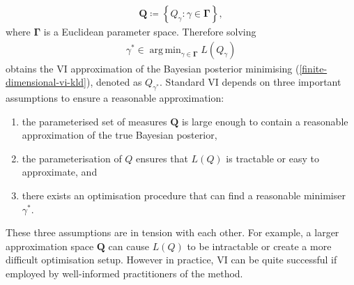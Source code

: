 \documentclass{article}
\DeclareMathOperator*{\argmin}{arg\,min}
\numberwithin{equation}{section}
\begin{document}
\begin{align}
    \boldsymbol{Q} \coloneqq \left\{Q_{\gamma}: \gamma \in \boldsymbol{\Gamma} \right\},
\end{align}
where $\boldsymbol{\Gamma}$ is a Euclidean parameter space. Therefore solving
\begin{align}
    \gamma^* \in \argmin_{\gamma \in \boldsymbol{\Gamma}} L(Q_{\gamma})
\end{align}
obtains the VI approximation of the Bayesian posterior minimising (\ref{finite-dimensional-vi-kld}), denoted as $Q_{\gamma^*}$. 
Standard VI depends on three important assumptions to ensure a reasonable approximation:
\begin{enumerate}
    \setlength\itemsep{-0.25em}
    \item the parameterised set of measures $\boldsymbol{Q}$ is large enough to contain a reasonable approximation of the true Bayesian posterior,
    \item the parameterisation of $Q$ ensures that $L(Q)$ is tractable or easy to approximate, and
    \item there exists an optimisation procedure that can find a reasonable minimiser $\gamma^*$.
\end{enumerate}
These three assumptions are in tension with each other.
For example, a larger approximation space $\boldsymbol{Q}$ can cause $L(Q)$ to be intractable or create a more difficult optimisation setup.
However in practice, VI can be quite successful if employed by well-informed practitioners of the method.
\end{document}
